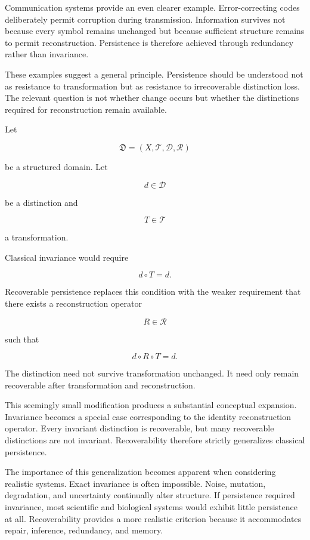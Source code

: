 \documentclass[12pt,oneside]{article}
\theoremstyle{definition}
\begin{document}
Communication systems provide an even clearer example. Error-correcting codes deliberately permit corruption during transmission. Information survives not because every symbol remains unchanged but because sufficient structure remains to permit reconstruction. Persistence is therefore achieved through redundancy rather than invariance.

These examples suggest a general principle. Persistence should be understood not as resistance to transformation but as resistance to irrecoverable distinction loss. The relevant question is not whether change occurs but whether the distinctions required for reconstruction remain available.

Let

\[
\mathfrak D
=
(X,\mathcal T,\mathcal D,\mathcal R)
\]

be a structured domain. Let

\[
d\in\mathcal D
\]

be a distinction and

\[
T\in\mathcal T
\]

a transformation.

Classical invariance would require

\[
d\circ T
=
d.
\]

Recoverable persistence replaces this condition with the weaker requirement that there exists a reconstruction operator

\[
R\in\mathcal R
\]

such that

\[
d\circ R\circ T
=
d.
\]

The distinction need not survive transformation unchanged. It need only remain recoverable after transformation and reconstruction.

This seemingly small modification produces a substantial conceptual expansion. Invariance becomes a special case corresponding to the identity reconstruction operator. Every invariant distinction is recoverable, but many recoverable distinctions are not invariant. Recoverability therefore strictly generalizes classical persistence.

The importance of this generalization becomes apparent when considering realistic systems. Exact invariance is often impossible. Noise, mutation, degradation, and uncertainty continually alter structure. If persistence required invariance, most scientific and biological systems would exhibit little persistence at all. Recoverability provides a more realistic criterion because it accommodates repair, inference, redundancy, and memory.
\end{document}
